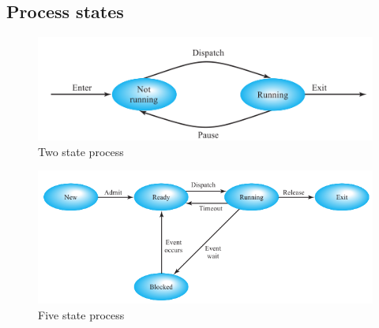 \subsection{Process states}

\begin{figure}
\centering
\includegraphics{img/twostate.PNG}
\caption{Two state process}
\label{fig:simpblock}
\end{figure}

\begin{figure}
\centering
\includegraphics{img/fivestate.PNG}
\caption{Five state process}
\label{fig:simpblock}
\end{figure}

